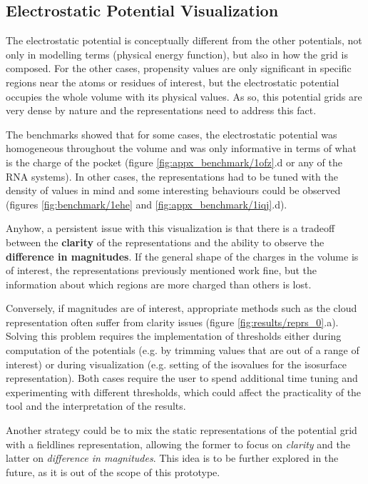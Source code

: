  \subsection{Electrostatic Potential Visualization}
    The electrostatic potential is conceptually different from the other potentials, not only in modelling terms (physical energy function), but also in how the grid is composed. For the other cases, propensity values are only significant in specific regions near the atoms or residues of interest, but the electrostatic potential occupies the whole volume with its physical values. As so, this potential grids are very dense by nature and the representations need to address this fact.

    The benchmarks showed that for some cases, the electrostatic potential was homogeneous throughout the volume and was only informative in terms of what is the charge of the pocket (figure \ref{fig:appx_benchmark/1ofz}.d or any of the RNA systems). In other cases, the representations had to be tuned with the density of values in mind and some interesting behaviours could be observed (figures \ref{fig:benchmark/1ehe} and \ref{fig:appx_benchmark/1iqj}.d).

    Anyhow, a persistent issue with this visualization is that there is a tradeoff between the \textbf{clarity} of the representations and the ability to observe the \textbf{difference in magnitudes}. If the general shape of the charges in the volume is of interest, the representations previously mentioned work fine, but the information about which regions are more charged than others is lost.

    Conversely, if magnitudes are of interest, appropriate methods such as the cloud representation often suffer from clarity issues (figure \ref{fig:results/reprs_0}.a). Solving this problem requires the implementation of thresholds either during computation of the potentials (e.g. by trimming values that are out of a range of interest) or during visualization (e.g. setting of the isovalues for the isosurface representation). Both cases require the user to spend additional time tuning and experimenting with different thresholds, which could affect the practicality of the tool and the interpretation of the results.

    Another strategy could be to mix the static representations of the potential grid with a fieldlines representation, allowing the former to focus on \textit{clarity} and the latter on \textit{difference in magnitudes}. This idea is to be further explored in the future, as it is out of the scope of this prototype.

